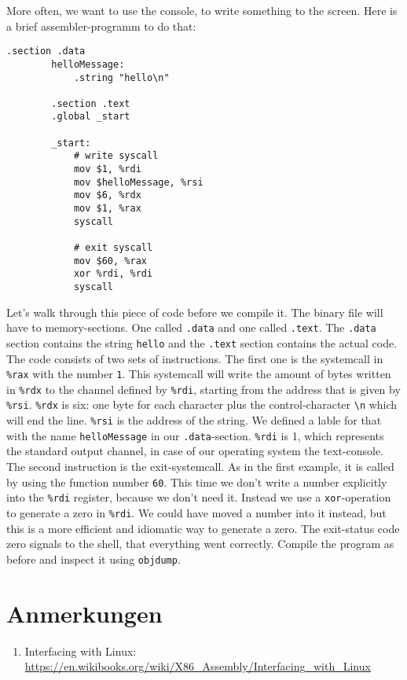 \documentclass{dcbl/challenge}
\begin{document}
\begin{aufgabe}
    More often, we want to use the console, to write something to the screen.
    Here is a brief assembler-programm to do that:
    \begin{lstlisting}[language={[x86masm]Assembler}, caption={Write "hello" into the console}]
        .section .data
        helloMessage:
            .string "hello\n"
        
        .section .text
        .global _start
        
        _start:
            # write syscall
            mov $1, %rdi                
            mov $helloMessage, %rsi     
            mov $6, %rdx               
            mov $1, %rax                
            syscall                     
        
            # exit syscall
            mov $60, %rax               
            xor %rdi, %rdi              
            syscall                     
    \end{lstlisting}
    Let's walk through this piece of code before we compile it. 
    The binary file will have to memory-sections. 
    One called \texttt{.data} and one called \texttt{.text}.
    The \texttt{.data} section contains the string \texttt{hello} and the \texttt{.text} section contains the actual code.
    The code consists of two sets of instructions. 
    The first one is the systemcall in \texttt{\%rax} with the number \texttt{1}. 
    This systemcall will write the amount of bytes written in \texttt{\%rdx} to the channel defined by \texttt{\%rdi}, starting from the address that is given by \texttt{\%rsi}.
    \texttt{\%rdx} is six: one byte for each character plus the control-character \texttt{\textbackslash n} which will end the line.
    \texttt{\%rsi} is the address of the string.
    We defined a lable for that with the name \texttt{helloMessage} in our \texttt{.data}-section.
    \texttt{\%rdi} is 1, which represents the standard output channel, in case of our operating system the text-console.\\
    The second instruction is the exit-systemcall. 
    As in the first example, it is called by using the function number \texttt{60}.
    This time we don't write a number explicitly into the \texttt{\%rdi} register, because we don't need it.
    Instead we use a \texttt{xor}-operation to generate a zero in \texttt{\%rdi}.
    We could have moved a number into it instead, but this is a more efficient and idiomatic way to generate a zero.
    The exit-status code zero signals to the shell, that everything went correctly.
    Compile the program as before and inspect it using \texttt{objdump}.
\end{aufgabe}



\section*{Anmerkungen}
\begin{enumerate}
    \item Interfacing with Linux: \url{https://en.wikibooks.org/wiki/X86_Assembly/Interfacing_with_Linux}
\end{enumerate}
\end{document}
